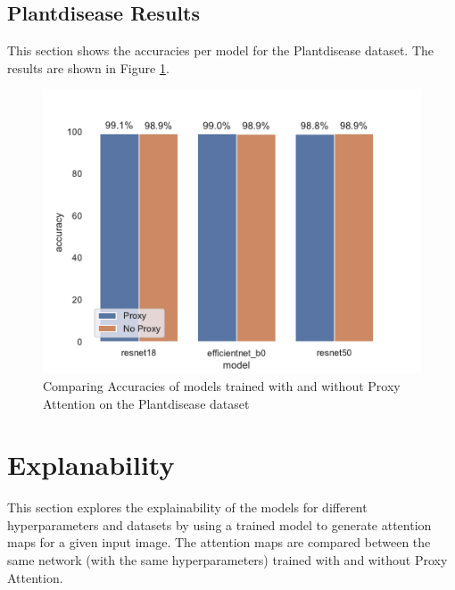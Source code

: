 \subsection{Plantdisease Results}
This section shows the accuracies per model for the Plantdisease dataset. The results are shown in Figure \ref{fig:plantdisease_results}. 
\begin{figure}[H]
    \centering
    \includegraphics[width=1\textwidth]{results/plantdisease_results.pdf}
    \caption{Comparing Accuracies of models trained with and without Proxy Attention on the Plantdisease dataset}
    \label{fig:plantdisease_results}
\end{figure}



\section{Explanability}
This section explores the explainability of the models for different hyperparameters and datasets by using a trained model to generate attention maps for a given input image. The attention maps are compared between the same network (with the same hyperparameters) trained with and without Proxy Attention.

